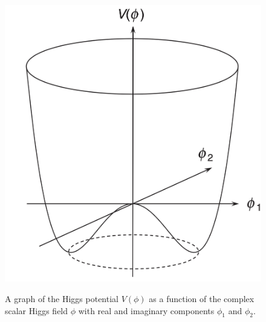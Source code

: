 \begin{figure}[H]
    \centering
    {\includegraphics[width=.5\textwidth]{Images/Theory/HiggsPotential.png}}
    \caption{A graph of the Higgs potential $V(\phi)$ as a function of the complex scalar Higgs field $\phi$ with real and imaginary components $\phi_1$ and $\phi_2$.}
    \label{fig:HiggsPotential}
\end{figure}
